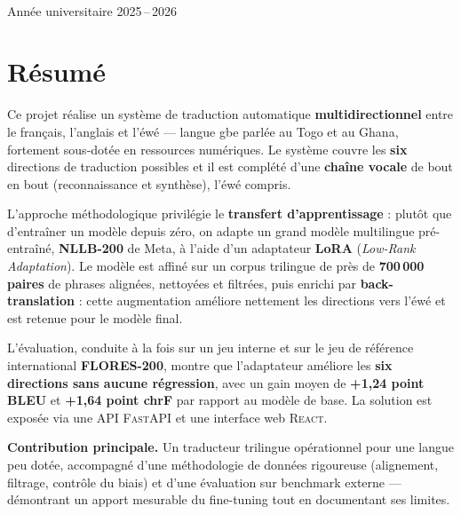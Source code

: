 \documentclass[11pt,a4paper]{article}
\begin{document}
\begin{titlepage}
\vfill
\noindent{\color{goldbright}\rule{\textwidth}{0.6pt}}\\[-0.34cm]
\noindent{\color{primary}\rule{\textwidth}{1.4pt}}
\begin{center}\sffamily\color{greytxt}\small Année universitaire 2025\,–\,2026\end{center}
\end{titlepage}

\section*{Résumé}

Ce projet réalise un système de traduction automatique \textbf{multidirectionnel} entre
le français, l'anglais et l'éwé — langue gbe parlée au Togo et au Ghana, fortement
sous-dotée en ressources numériques. Le système couvre les \textbf{six} directions de
traduction possibles et il est complété d'une \textbf{chaîne vocale} de bout en bout
(reconnaissance et synthèse), l'éwé compris.

L'approche méthodologique privilégie le \textbf{transfert d'apprentissage} : plutôt que
d'entraîner un modèle depuis zéro, on adapte un grand modèle multilingue pré-entraîné,
\textbf{NLLB-200} de Meta, à l'aide d'un adaptateur \textbf{LoRA} (\emph{Low-Rank
Adaptation}). Le modèle est affiné sur un corpus trilingue de près de
\textbf{700\,000 paires} de phrases alignées, nettoyées et filtrées, puis enrichi par
\textbf{back-translation} : cette augmentation améliore nettement les directions vers
l'éwé et est retenue pour le modèle final.

L'évaluation, conduite à la fois sur un jeu interne et sur le jeu de référence
international \textbf{FLORES-200}, montre que l'adaptateur améliore les \textbf{six
directions sans aucune régression}, avec un gain moyen de \textbf{+1,24 point BLEU} et
\textbf{+1,64 point chrF} par rapport au modèle de base. La solution est exposée via une
API \textsc{FastAPI} et une interface web \textsc{React}.

\begin{infobox}
\textbf{Contribution principale.} Un traducteur trilingue opérationnel pour une langue
peu dotée, accompagné d'une méthodologie de données rigoureuse (alignement, filtrage,
contrôle du biais) et d'une évaluation sur benchmark externe — démontrant un
apport mesurable du fine-tuning tout en documentant ses limites.
\end{infobox}
\end{document}
